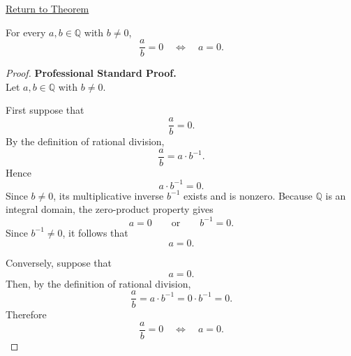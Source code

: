 \newpage
{}
\label{prf:rational-quotient-zero-iff-numerator-zero}

\begin{remark*}[Return]
\hyperref[thm:rational-quotient-zero-iff-numerator-zero]{Return to Theorem}
\end{remark*}

\begin{theorem*}
For every $a,b\in\mathbb{Q}$ with $b\neq 0$,
\[
\frac{a}{b}=0
\quad\Longleftrightarrow\quad
a=0.
\]
\end{theorem*}

\begin{proof}
\textbf{Professional Standard Proof.}~\\
Let $a,b\in\mathbb{Q}$ with $b\neq 0$.

First suppose that
\[
\frac{a}{b}=0.
\]
By the definition of rational division,
\[
\frac{a}{b}=a\cdot b^{-1}.
\]
Hence
\[
a\cdot b^{-1}=0.
\]
Since $b\neq 0$, its multiplicative inverse $b^{-1}$ exists and is nonzero.
Because $\mathbb{Q}$ is an integral domain, the zero-product property gives
\[
a=0
\qquad\text{or}\qquad
b^{-1}=0.
\]
Since $b^{-1}\neq 0$, it follows that
\[
a=0.
\]

Conversely, suppose that
\[
a=0.
\]
Then, by the definition of rational division,
\[
\frac{a}{b}=a\cdot b^{-1}=0\cdot b^{-1}=0.
\]
Therefore
\[
\frac{a}{b}=0
\quad\Longleftrightarrow\quad
a=0.
\]
\end{proof}

